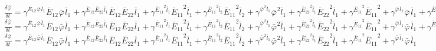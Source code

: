 $\frac{{\delta}^{} {\bar{\varphi}}_{}}{{\delta} {{{t}}_{}}^{}} = {\gamma}^{{{{\bar{E}}_{12}}^{}{{\bar{\varphi}}_{}}^{}{{\bar{l}}_{1}}^{}}}{{{\bar{E}}_{12}}^{}{{\bar{\varphi}}_{}}^{}{{\bar{l}}_{1}}^{}} + {\gamma}^{{{{\bar{E}}_{12}}^{}{{\bar{E}}_{22}}^{}{{\bar{l}}_{1}}^{}}}{{{\bar{E}}_{12}}^{}{{\bar{E}}_{22}}^{}{{\bar{l}}_{1}}^{}} + {\gamma}^{{{{\bar{E}}_{11}}^{2}{{\bar{l}}_{1}}^{}}}{{{\bar{E}}_{11}}^{2}{{\bar{l}}_{1}}^{}} + {\gamma}^{{{{\bar{E}}_{11}}^{2}{{\bar{l}}_{2}}^{}}}{{{\bar{E}}_{11}}^{2}{{\bar{l}}_{2}}^{}} + {\gamma}^{{{{\bar{\varphi}}_{}}^{2}{{\bar{l}}_{1}}^{}}}{{{\bar{\varphi}}_{}}^{2}{{\bar{l}}_{1}}^{}} + {\gamma}^{{{{\bar{E}}_{22}}^{2}{{\bar{l}}_{1}}^{}}}{{{\bar{E}}_{22}}^{2}{{\bar{l}}_{1}}^{}} + {\gamma}^{{{{\bar{E}}_{11}}^{2}}}{{{\bar{E}}_{11}}^{2}} + {\gamma}^{{{{\bar{\varphi}}_{}}^{}{{\bar{l}}_{1}}^{}}}{{{\bar{\varphi}}_{}}^{}{{\bar{l}}_{1}}^{}} + {\gamma}^{{{{\bar{E}}_{11}}^{}{{\bar{l}}_{1}}^{}}}{{{\bar{E}}_{11}}^{}{{\bar{l}}_{1}}^{}} + {\gamma}^{{{{\bar{E}}_{12}}^{}{{\bar{l}}_{1}}^{}}}{{{\bar{E}}_{12}}^{}{{\bar{l}}_{1}}^{}}$
$\frac{{\delta}^{} {\bar{\varphi}}_{}}{{\delta} {{{t}}_{}}^{}} = {\gamma}^{{{{\bar{E}}_{12}}^{}{{\bar{\varphi}}_{}}^{}{{\bar{l}}_{1}}^{}}}{{{\bar{E}}_{12}}^{}{{\bar{\varphi}}_{}}^{}{{\bar{l}}_{1}}^{}} + {\gamma}^{{{{\bar{E}}_{12}}^{}{{\bar{E}}_{22}}^{}{{\bar{l}}_{1}}^{}}}{{{\bar{E}}_{12}}^{}{{\bar{E}}_{22}}^{}{{\bar{l}}_{1}}^{}} + {\gamma}^{{{{\bar{E}}_{11}}^{2}{{\bar{l}}_{1}}^{}}}{{{\bar{E}}_{11}}^{2}{{\bar{l}}_{1}}^{}} + {\gamma}^{{{{\bar{E}}_{11}}^{2}{{\bar{l}}_{2}}^{}}}{{{\bar{E}}_{11}}^{2}{{\bar{l}}_{2}}^{}} + {\gamma}^{{{{\bar{\varphi}}_{}}^{2}{{\bar{l}}_{1}}^{}}}{{{\bar{\varphi}}_{}}^{2}{{\bar{l}}_{1}}^{}} + {\gamma}^{{{{\bar{E}}_{22}}^{2}{{\bar{l}}_{1}}^{}}}{{{\bar{E}}_{22}}^{2}{{\bar{l}}_{1}}^{}} + {\gamma}^{{{{\bar{E}}_{11}}^{2}}}{{{\bar{E}}_{11}}^{2}} + {\gamma}^{{{{\bar{\varphi}}_{}}^{}{{\bar{l}}_{1}}^{}}}{{{\bar{\varphi}}_{}}^{}{{\bar{l}}_{1}}^{}} + {\gamma}^{{{{\bar{E}}_{11}}^{}{{\bar{l}}_{1}}^{}}}{{{\bar{E}}_{11}}^{}{{\bar{l}}_{1}}^{}}$
$\frac{{\delta}^{} {\bar{\varphi}}_{}}{{\delta} {{{t}}_{}}^{}} = {\gamma}^{{{{\bar{E}}_{12}}^{}{{\bar{\varphi}}_{}}^{}{{\bar{l}}_{1}}^{}}}{{{\bar{E}}_{12}}^{}{{\bar{\varphi}}_{}}^{}{{\bar{l}}_{1}}^{}} + {\gamma}^{{{{\bar{E}}_{12}}^{}{{\bar{E}}_{22}}^{}{{\bar{l}}_{1}}^{}}}{{{\bar{E}}_{12}}^{}{{\bar{E}}_{22}}^{}{{\bar{l}}_{1}}^{}} + {\gamma}^{{{{\bar{E}}_{11}}^{2}{{\bar{l}}_{1}}^{}}}{{{\bar{E}}_{11}}^{2}{{\bar{l}}_{1}}^{}} + {\gamma}^{{{{\bar{E}}_{11}}^{2}{{\bar{l}}_{2}}^{}}}{{{\bar{E}}_{11}}^{2}{{\bar{l}}_{2}}^{}} + {\gamma}^{{{{\bar{\varphi}}_{}}^{2}{{\bar{l}}_{1}}^{}}}{{{\bar{\varphi}}_{}}^{2}{{\bar{l}}_{1}}^{}} + {\gamma}^{{{{\bar{E}}_{22}}^{2}{{\bar{l}}_{1}}^{}}}{{{\bar{E}}_{22}}^{2}{{\bar{l}}_{1}}^{}} + {\gamma}^{{{{\bar{E}}_{11}}^{2}}}{{{\bar{E}}_{11}}^{2}} + {\gamma}^{{{{\bar{\varphi}}_{}}^{}{{\bar{l}}_{1}}^{}}}{{{\bar{\varphi}}_{}}^{}{{\bar{l}}_{1}}^{}}$

